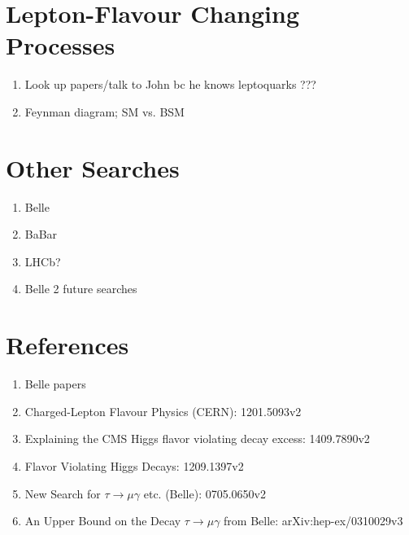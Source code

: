 \documentclass[a4paper]{article} %
\begin{document}
\section{Lepton-Flavour Changing Processes}
\begin{enumerate}
\item Look up papers/talk to John bc he knows leptoquarks ???
\item Feynman diagram; SM vs. BSM
\end{enumerate}

\section{Other Searches}
\begin{enumerate}
\item Belle
\item BaBar
\item LHCb?
\item Belle 2 future searches
\end{enumerate}

\section{References}
\begin{enumerate}
\item Belle papers
\item Charged-Lepton Flavour Physics (CERN): 1201.5093v2
\item Explaining the CMS Higgs flavor violating decay excess: 1409.7890v2
\item Flavor Violating Higgs Decays: 1209.1397v2
\item New Search for $\tau\to\mu\gamma$ etc. (Belle): 0705.0650v2
\item An Upper Bound on the Decay $\tau\to\mu\gamma$ from Belle: arXiv:hep-ex/0310029v3
\end{enumerate}





\pagebreak



\end{document}
